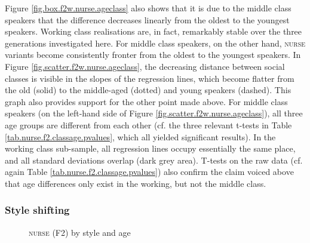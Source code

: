 Figure \ref{fig.box.f2w.nurse.ageclass} also shows that it is due to the middle class speakers that the  difference decreases linearly from the oldest to the youngest speakers.
Working class realisations are, in fact, remarkably stable over the three generations investigated here.
For middle class speakers, on the other hand, \textsc{nurse} variants become consistently fronter from the oldest to the youngest speakers.
In Figure \ref{fig.scatter.f2w.nurse.ageclass}, the decreasing distance between social classes is visible in the slopes of the regression lines, which become flatter from the old (solid) to the middle-aged (dotted) and young speakers (dashed).
This graph also provides support for the other point made above.
For middle class speakers (on the left-hand side of Figure \ref{fig.scatter.f2w.nurse.ageclass}), all three age groups are different from each other (cf. the three relevant t-tests in Table \ref{tab.nurse.f2.classage.pvalues}, which all yielded significant results).
In the working class sub-sample, all regression lines occupy essentially the same place, and all standard deviations overlap (dark grey area).
T-tests on the raw data (cf. again Table \ref{tab.nurse.f2.classage.pvalues}) also confirm the claim voiced above that age differences only exist in the working, but not the middle class.

\subsubsection{Style shifting}
\label{sec.prod.res.vow.nurse.f2.shifting}

\begin{figure}[h!]
	\centering
		\resizebox{0.5\linewidth}{!}{} 
	\caption{\textsc{nurse} (F2) by style and age}
	\label{fig.line.f2.nurse.tot}
\end{figure}

